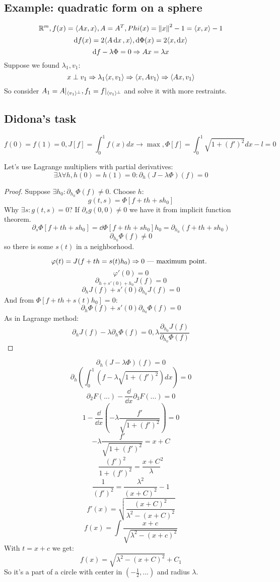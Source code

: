 \subsection*{Example: quadratic form on a sphere}

\[ \mathbb R^m, f(x) = \langle Ax, x \rangle, A = A^T, Phi(x) = \norm{x}^2 - 1 = \langle x, x \rangle - 1 \]
\[ \dd{f(x)} =  2\langle A \dd{x}, x \rangle, \dd{\Phi(x)} = 2\langle x, \dd{x} \rangle \] 
\[ \dd{f - \lambda \Phi} = 0 \Rightarrow Ax = \lambda x \] 
Suppose we found $\lambda_1, v_1$:
\[ x \perp v_1 \Rightarrow \lambda_1 \langle x, v_1 \rangle \Rightarrow \langle x, Av_1 \rangle \Rightarrow \langle Ax, v_1 \rangle \]
So consider $A_1 = A|_{\langle v_1 \rangle^\perp}, f_1 = f|_{\langle v_1 \rangle^\perp}$ and solve it with more restraints.

\subsection*{Didona's task}

\[ f(0) = f(1) = 0, J[f] = \int_0^1 f(x) dx \to \max, \Phi[f] = \int_0^1 \sqrt{1 + (f')^2} dx - l = 0 \]

Let's use Lagrange multipliers with partial derivatives:
\[ \exists \lambda \forall h, h(0) = h(1) = 0: \partial_h (J - \lambda \Phi)(f) = 0 \] 

\begin{proof}
Suppose $\exists h_0: \partial_{h_0} \Phi(f) \ne 0$. Choose $h$:
\[ g(t, s) = \Phi[f + th + sh_0] \] 
Why $\exists s: g(t, s) = 0$? If $\partial_s g(0, 0) \ne 0$ we have it from implicit function theorem.
\[ \partial_s \Phi[f + th + sh_0] = \dd{\Phi[f + th + sh_0]} h_0 = \partial_{h_0} (f + th + sh_0) \]
\[  \partial_{h_0} \Phi(f) \ne 0 \] 
so there is some $s(t)$ in a neighborhood.

\[ \varphi(t) = J(f + th = s(t)h_0) \Rightarrow 0\text{ --- maximum point. }\] 
\[ \varphi'(0) = 0 \] 
\[ \partial_{h + s'(0) + h_0}J(f) = 0 \] 
\[ \partial_h J(f) + s'(0) \partial_{h_0} J(f) = 0 \] 
And from $\Phi[f + th + s(t)h_0] = 0$:
\[ \partial_h \Phi(f) + s'(0) \partial_{h_0} \Phi(f) = 0 \]
As in Lagrange method:
\[ \partial_h J(f) - \lambda \partial_h \Phi(f) = 0, \lambda \frac{\partial_{h_0} J(f)}{\partial_{h_0} \Phi(f)} \]
\end{proof}

\[ \partial_h (J - \lambda \Phi)(f) = 0 \] 
\[ \partial_h (\int_0^1 (f - \lambda\sqrt{1 + (f')^2}) dx) = 0 \]
\[ \partial_2 F(...) - \frac{\dd}{\dd{x}} \partial_3 F(...) = 0 \] 
\[ 1 - \frac{\dd}{\dd{x}}(-\lambda \frac{f'}{\sqrt{1 + (f')^2}}) = 0 \] 
\[ -\lambda \frac{f'}{\sqrt{1 + (f')^2}} = x + C \] 
\[ \frac{(f')^2}{1 + (f')^2} = \frac{x + C}{\lambda}^2 \]
\[ \frac{1}{(f')^2} = \frac{\lambda^2}{(x+C)^2} - 1 \]
\[ f'(x) = \sqrt{\frac{(x+C)^2}{\lambda^2 - (x+C)^2}} \] 
\[ f(x) = \int \frac{x + c}{\sqrt{\lambda^2 - (x+c)^2}} \] 
With $t = x + c$ we get:
\[ f(x) = \sqrt{\lambda^2 - (x+C)^2} + C_1 \] 
So it's a part of a circle with center in $(-\frac12, ...)$ and radius $\lambda$.


